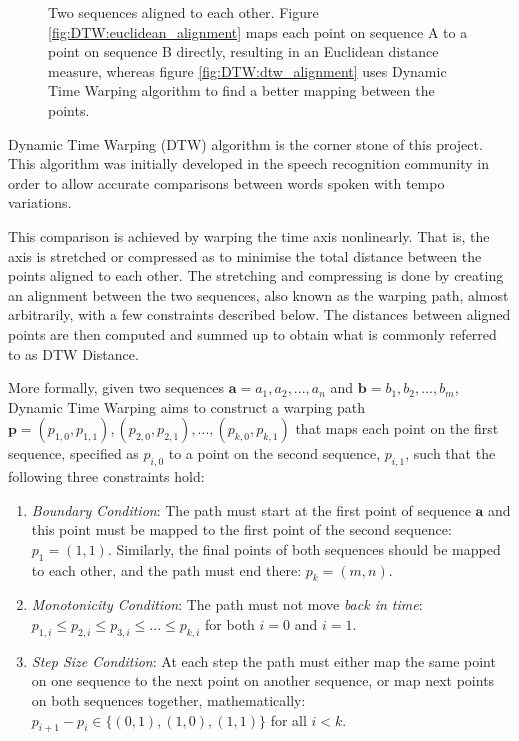 \documentclass[parskip]{cs4rep}
\begin{document}
\begin{figure}[b,t]
   \caption{Two sequences aligned to each other. Figure \ref{fig:DTW:euclidean_alignment} maps each point on sequence A to a point on sequence B directly, resulting in an Euclidean distance measure, whereas figure \ref{fig:DTW:dtw_alignment} uses Dynamic Time Warping algorithm to find a better mapping between the points.}
   \label{fig:DTW:alignments}
\end{figure}

Dynamic Time Warping (DTW) algorithm is the corner stone of this project. This algorithm was initially developed in the speech recognition community in order to allow accurate comparisons between words spoken with tempo variations. 

This comparison is achieved by warping the time axis nonlinearly. That is, the axis is stretched or compressed as to minimise the total distance between the points aligned to each other. The stretching and compressing is done by creating an alignment between the two sequences, also known as the warping path, almost arbitrarily, with a few constraints described below. The distances between aligned points are then computed and summed up to obtain what is commonly referred to as DTW Distance.

More formally, given two sequences $\mathbf{a} = a_1, a_2, ..., a_n$ and $\mathbf{b} = b_1, b_2, ..., b_m$, Dynamic Time Warping aims to construct a warping path\\
$\mathbf{p} = { (p_{1,0}, p_{1,1}), (p_{2,0}, p_{2,1}), ..., (p_{k,0}, p_{k, 1}) }$ that maps each point on the first sequence, specified as $p_{i,0}$ to a point on the second sequence, $p_{i,1}$, such that the following three constraints hold:

\begin{enumerate}
\item \emph{Boundary Condition}: The path must start at the first point of sequence $\mathbf{a}$ and this point must be mapped to the first point of the second sequence: $p_1 = (1,1)$. Similarly, the final points of both sequences should be mapped to each other, and the path must end there: $p_k = (m, n).$ 
\item \emph{Monotonicity Condition}: The path must not move \emph{back in time}: 
    $p_{1,i} \le p_{2,i} \le p_{3,i} \le ... \le p_{k, i}$ for both $i=0$ and $i=1$.
\item \emph{Step Size Condition}: At each step the path must either map the same point on one sequence to the next point on another sequence, or map next points on both sequences together, mathematically:
    $p_{i+1} - p_{i} \in \{(0,1), (1,0), (1,1)\}$ for all $i < k$.
\end{enumerate}
\end{document}
